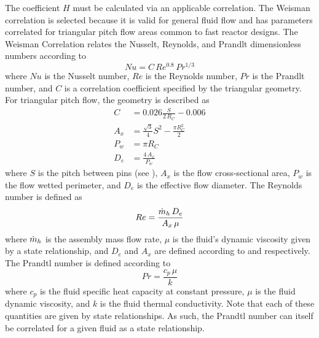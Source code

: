       The coefficient $H$ must be calculated via an applicable correlation.
      The Weisman correlation is selected because it is valid for general fluid
      flow and has parameters correlated for triangular pitch flow areas common
      to fast reactor designs. The Weisman Correlation relates the Nusselt,
      Reynolds, and Prandlt dimensionless numbers according to
      \begin{equation}
        \label{eq:weisman}
        Nu = C \, Re^{0.8} \, Pr^{1/3}
      \end{equation}
      where $Nu$ is the Nusselt number, $Re$ is the Reynolds number, $Pr$ is 
      the Prandlt number, and $C$ is a correlation coefficient specified by the
      triangular geometry. For triangular pitch flow, the geometry is described
      as
      \begin{align}
        \label{eq:weisman_c}
        C &= 0.026 \frac{S}{2 \, R_C} - 0.006 \\
        \label{eq:weisman_ax}
        A_x &= \frac{\sqrt{3}}{4} S^2 - \frac{\pi R_C^2}{2} \\
        \label{eq:weisman_pw}
        P_w &= \pi R_C \\
        \label{eq:weisman_de}
        D_e &= \frac{4 \, A_x}{P_w}
      \end{align}
      where $S$ is the pitch between pins (see ), $A_x$ is the
      flow cross-sectional area, $P_w$ is the flow wetted perimeter, and $D_e$
      is the effective flow diameter. The Reynolds number is defined as
      \begin{equation}
        \label{eq:re}
        Re = \frac{\dot{m}_h \, D_e}{A_x \, \mu}
      \end{equation}
      where $\dot{m}_h$ is the assembly mass flow rate, $\mu$ is the fluid's
      dynamic viscosity given by a state relationship, and $D_e$ and $A_x$ are 
      defined according to  and 
      respectively. The Prandtl number is defined according to 
      \begin{equation}
        \label{eq:pr}
        Pr = \frac{c_p \, \mu}{k}
      \end{equation}
      where $c_p$ is the fluid specific heat capacity at constant pressure, 
      $\mu$ is the fluid dynamic viscosity, and $k$ is the fluid thermal 
      conductivity. Note that each of these quantities are given by state 
      relationships. As such, the Prandtl number can itself be correlated for a
      given fluid as a state relationship.
      
